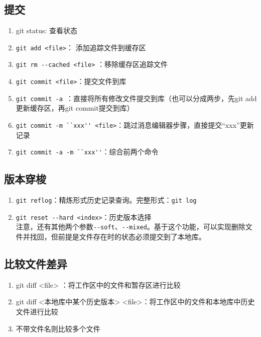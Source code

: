 \subsection{提交}
\begin{enumerate}
\item git status: 查看状态
\item \verb|git add <file>|： 添加追踪文件到缓存区 
\item  \verb|git rm --cached <file>| ：移除缓存区追踪文件
\item \verb|git commit <file>|：提交文件到库
\item \verb|git commit -a |：直接将所有修改文件提交到库（也可以分成两步，先git add更新缓存区，再git commit提交到库）
\item \verb|git commit -m ``xxx'' <file>|：跳过消息编辑器步骤，直接提交“xxx”更新记录
\item \verb|git commit -a -m ``xxx''|：综合前两个命令
\end{enumerate}



\subsection{版本穿梭}
\begin{enumerate}
\item \verb|git reflog|：精炼形式历史记录查询。完整形式：\verb|git log| 

\item \verb|git reset --hard <index>|：历史版本选择\\
注意，还有其他两个参数\verb|--soft|、\verb|--mixed|。基于这个功能，可以实现删除文件并找回，但前提是文件存在时的状态必须提交到了本地库。
\end{enumerate}



\subsection{比较文件差异}
\begin{enumerate}
\item git diff <file> ：将工作区中的文件和暂存区进行比较
\item git diff <本地库中某个历史版本> <file>：将工作区中的文件和本地库中历史文件进行比较
\item 不带文件名则比较多个文件
\end{enumerate}



